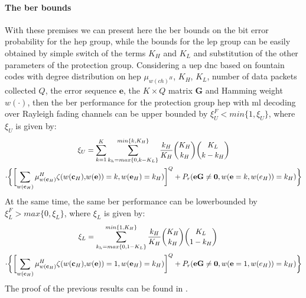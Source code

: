 \paragraph{The \gls{ber} bounds}
With these premises we can present here the \gls{ber} bounds on the bit error probability for the \gls{hep} group, while the bounds for the \gls{lep} group can be easily obtained by simple switch of the terms $K_H$ and $K_L$ and substitution of the other parameters of the protection group. Considering a \gls{uep} \gls{dnc} based on fountain codes with degree distribution on \gls{hep} $\mu_{w(ch)^H}$, $K_H$, $K_L$, number of data packets collected $Q$, the error sequence $\mathbf{e}$, the $K\times Q$ matrix $\mathbf{G}$ and Hamming weight $w(\cdot)$, then the \gls{ber} performance for the protection group \gls{hep} with \gls{ml} decoding over Rayleigh fading channels can be upper bounded by $\xi_U^F < min\{1,\xi_U\}$, where $\xi_U$ is given by:
\begin{align}
\centering
  \xi_U & = \sum_{k=1}^K\sum_{k_h = max\{0,k-K_L\}}^{min\{k,K_H\}}\frac{k_H}{K_H}\binom{K_H}{k_H}\binom{K_L}{k - k_H}\\
   \cdot\biggl\{\biggl[\sum_{w(\mathbf{c}_H)}\mu_{w(\mathbf{c}_H)}^H\zeta(w(\mathbf{c}_H),&w(\mathbf{e})) = k,w(\mathbf{e}_H) = k_H)\biggr]^Q+P_r(\mathbf{eG} \neq \mathbf{0},w(\mathbf{e} = k, w(e_H)) = k_H)\biggr\}
\end{align}
At the same time, the same \gls{ber} performance can be lowerbounded by $\xi_L^F > max\{0,\xi_L\}$, where $\xi_L$ is given by:
\begin{align}
\centering
  \xi_L & = \sum_{k_h = max\{0,1-K_L\}}^{min\{1,K_H\}}\frac{k_H}{K_H}\binom{K_H}{k_H}\binom{K_L}{1 - k_H}\\
   \cdot\biggl\{\biggl[\sum_{w(\mathbf{c}_H)}\mu_{w(\mathbf{c}_H)}^H\zeta(w(\mathbf{c}_H),&w(\mathbf{e})) = 1,w(\mathbf{e}_H) = k_H)\biggr]^Q+P_r(\mathbf{eG} \neq \mathbf{0},w(\mathbf{e} = 1, w(e_H)) = k_H)\biggr\}
\end{align}
The proof of the previous results can be found in \cite{Yue2014}.

